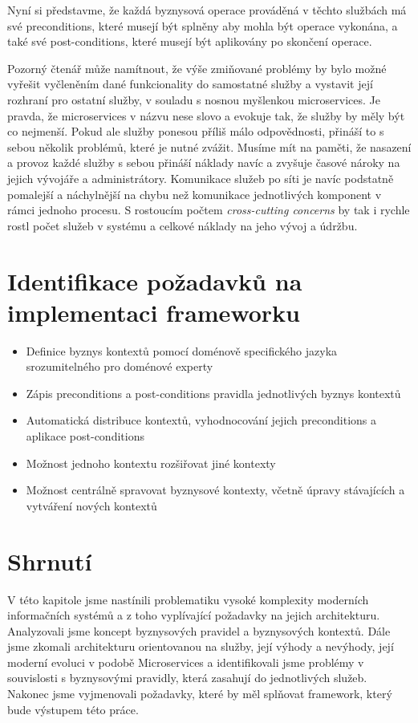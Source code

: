 Nyní si představme, že každá byznysová operace prováděná v těchto
službách má své preconditions, které musejí být splněny aby mohla
být operace vykonána, a také své post-conditions, které musejí být
aplikovány po skončení operace.

Pozorný čtenář může namítnout, že výše zmiňované problémy by
bylo možné vyřešit vyčleněním dané funkcionality
do samostatné služby a vystavit její rozhraní pro ostatní služby,
v souladu s nosnou myšlenkou microservices. Je pravda, že microservices
v názvu nese slovo  a evokuje tak, že služby by měly být co nejmenší.
Pokud ale služby ponesou příliš málo odpovědnosti, přináší to s sebou
několik problémů, které je nutné zvážit. Musíme mít na paměti, že
nasazení a provoz každé služby s sebou přináší náklady navíc
a zvyšuje časové nároky na jejich vývojáře a administrátory.
Komunikace služeb po síti je navíc podstatně pomalejší a náchylnější na
chybu než komunikace jednotlivých komponent v rámci jednoho procesu.
S rostoucím počtem \textit{cross-cutting concerns} by tak i rychle rostl
počet služeb v systému a celkové náklady na jeho vývoj a údržbu.

\section{Identifikace požadavků na implementaci frameworku}

\begin{itemize}
    \item{Definice byznys kontextů pomocí doménově specifického jazyka srozumitelného pro doménové experty}
    \item{Zápis preconditions a post-conditions pravidla jednotlivých byznys kontextů}
    \item{Automatická distribuce kontextů, vyhodnocování jejich preconditions a aplikace post-conditions}
    \item{Možnost jednoho kontextu rozšiřovat jiné kontexty}
    \item{Možnost centrálně spravovat byznysové kontexty, včetně úpravy stávajících a vytváření nových kontextů}
\end{itemize}

\section{Shrnutí}

V této kapitole jsme nastínili problematiku vysoké komplexity moderních informačních systémů
a z toho vyplívající požadavky na jejich architekturu. Analyzovali jsme koncept byznysových
pravidel a byznysových kontextů. Dále jsme zkomali architekturu orientovanou na služby, její
výhody a nevýhody, její moderní evoluci v podobě Microservices a identifikovali jsme problémy
v souvislosti s byznysovými pravidly, která zasahují do jednotlivých služeb. Nakonec jsme
vyjmenovali požadavky, které by měl splňovat framework, který bude výstupem této práce.
